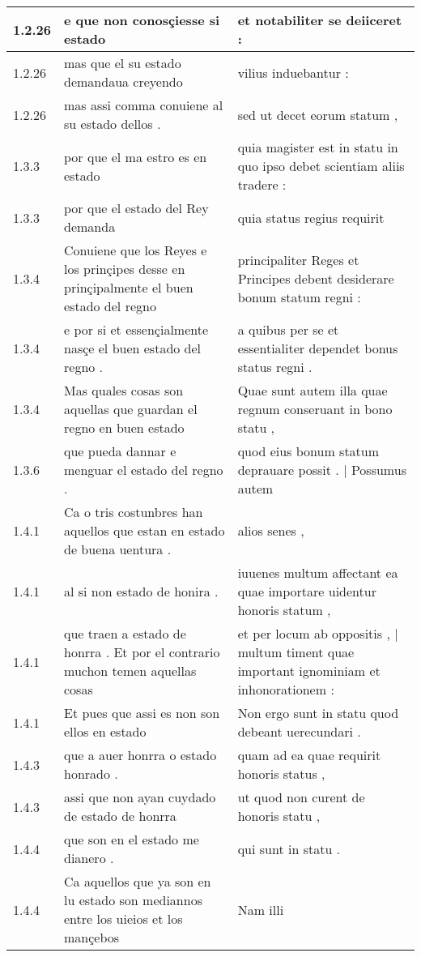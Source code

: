 \begin{tabular}{|p{1cm}|p{6.5cm}|p{6.5cm}|}
1.2.26 & e que non conosçiesse si estado & et notabiliter se deiiceret : \\\hline
1.2.26 & mas que el su estado demandaua creyendo & vilius induebantur : \\\hline
1.2.26 & mas assi comma conuiene al su estado dellos . & sed ut decet eorum statum , \\\hline
1.3.3 & por que el ma estro es en estado & quia magister est in statu in quo ipso debet scientiam aliis tradere : \\\hline
1.3.3 & por que el estado del Rey demanda & quia status regius requirit \\\hline
1.3.4 & Conuiene que los Reyes e los prinçipes desse en prinçipalmente el buen estado del regno & principaliter Reges et Principes debent desiderare bonum statum regni : \\\hline
1.3.4 & e por si et essençialmente nasçe el buen estado del regno . & a quibus per se et essentialiter dependet bonus status regni . \\\hline
1.3.4 & Mas quales cosas son aquellas que guardan el regno en buen estado & Quae sunt autem illa quae regnum conseruant in bono statu , \\\hline
1.3.6 & que pueda dannar e menguar el estado del regno . & quod eius bonum statum deprauare possit . | Possumus autem \\\hline
1.4.1 & Ca o tris costunbres han aquellos que estan en estado de buena uentura . & alios senes , \\\hline
1.4.1 & al si non estado de honira . & iuuenes multum affectant ea quae importare uidentur honoris statum , \\\hline
1.4.1 & que traen a estado de honrra . Et por el contrario muchon temen aquellas cosas & et per locum ab oppositis , | multum timent quae important ignominiam et inhonorationem : \\\hline
1.4.1 & Et pues que assi es non son ellos en estado & Non ergo sunt in statu quod debeant uerecundari . \\\hline
1.4.3 & que a auer honrra o estado honrado . & quam ad ea quae requirit honoris status , \\\hline
1.4.3 & assi que non ayan cuydado de estado de honrra & ut quod non curent de honoris statu , \\\hline
1.4.4 & que son en el estado me dianero . & qui sunt in statu . \\\hline
1.4.4 & Ca aquellos que ya son en lu estado son mediannos entre los uieios et los mançebos & Nam illi \\\hline

\end{tabular}
